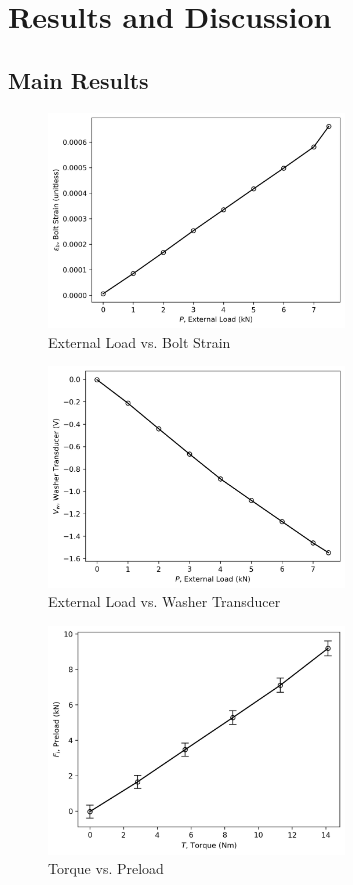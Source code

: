 \section{Results and Discussion}
\subsection{Main Results}
\begin{figure}[h]
    \centering
    \includegraphics[width=0.7\textwidth]{Sections/Figures/external_load_vs_bolt_strain.png}
    \caption{External Load vs. Bolt Strain}
    \label{fig:external_load_vs_bolt_strain}
\end{figure}
\begin{figure}[h]
    \centering
    \includegraphics[width=0.7\textwidth]{Sections/Figures/external_load_vs_washer_transducer.png}
    \caption{External Load vs. Washer Transducer}
    \label{fig:external_load_vs_washer_transducer}
\end{figure}
\begin{figure}[h]
    \centering
    \includegraphics[width=0.7\textwidth]{Sections/Figures/torque_vs_preload.png}
    \caption{Torque vs. Preload}
    \label{fig:torque_vs_preload}
\end{figure}
